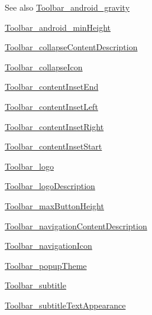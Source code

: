 \begin{DoxySeeAlso}{See also}
\hyperlink{classcheck_1_1test_1_1_r_1_1styleable_a573eae0b826181d39d3b0ac3c26b7ec7}{Toolbar\+\_\+android\+\_\+gravity} 

\hyperlink{classcheck_1_1test_1_1_r_1_1styleable_a50d77cb71359f8a286d3bcd9212afde6}{Toolbar\+\_\+android\+\_\+min\+Height} 

\hyperlink{classcheck_1_1test_1_1_r_1_1styleable_abd8a8ed6f421b71bedf016b8648abba2}{Toolbar\+\_\+collapse\+Content\+Description} 

\hyperlink{classcheck_1_1test_1_1_r_1_1styleable_a768d406fdf51c661de7d2c032a071146}{Toolbar\+\_\+collapse\+Icon} 

\hyperlink{classcheck_1_1test_1_1_r_1_1styleable_a2dfa579a4e4d1b7daec868e5ef8667f9}{Toolbar\+\_\+content\+Inset\+End} 

\hyperlink{classcheck_1_1test_1_1_r_1_1styleable_ab328787f8cee01addd35369b3193085f}{Toolbar\+\_\+content\+Inset\+Left} 

\hyperlink{classcheck_1_1test_1_1_r_1_1styleable_a03f33bda55e3dc7f0e54ed0c302c497e}{Toolbar\+\_\+content\+Inset\+Right} 

\hyperlink{classcheck_1_1test_1_1_r_1_1styleable_a9dae7a4f6dfee5c810df77ff15242164}{Toolbar\+\_\+content\+Inset\+Start} 

\hyperlink{classcheck_1_1test_1_1_r_1_1styleable_a42f433954d5c39edb50f485b83d4bfbd}{Toolbar\+\_\+logo} 

\hyperlink{classcheck_1_1test_1_1_r_1_1styleable_aa33122c1e3e1e09c60ff7a33506a08d8}{Toolbar\+\_\+logo\+Description} 

\hyperlink{classcheck_1_1test_1_1_r_1_1styleable_a2a04c6b8bb844f8f793cb6990bd70a78}{Toolbar\+\_\+max\+Button\+Height} 

\hyperlink{classcheck_1_1test_1_1_r_1_1styleable_ad99d197ecf766148183b75964c1fcb43}{Toolbar\+\_\+navigation\+Content\+Description} 

\hyperlink{classcheck_1_1test_1_1_r_1_1styleable_a991bcba8e01110fe04b1c4f26bbfccc9}{Toolbar\+\_\+navigation\+Icon} 

\hyperlink{classcheck_1_1test_1_1_r_1_1styleable_a731a060d7a21c9b47869e797b622fce9}{Toolbar\+\_\+popup\+Theme} 

\hyperlink{classcheck_1_1test_1_1_r_1_1styleable_a8215e68d4a9819e686f4e4bbe6f2faef}{Toolbar\+\_\+subtitle} 

\hyperlink{classcheck_1_1test_1_1_r_1_1styleable_a144e9a2b2baf47ad3bc709462b1a5bbb}{Toolbar\+\_\+subtitle\+Text\+Appearance} 


\end{DoxySeeAlso}
